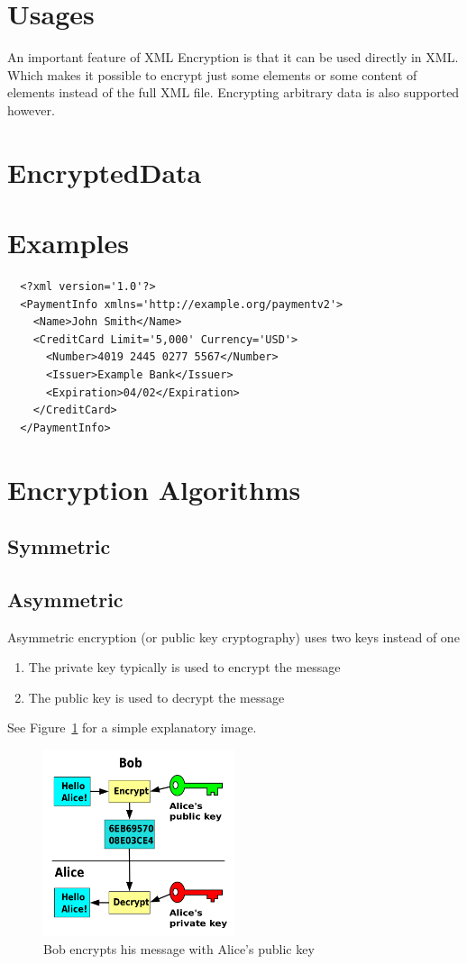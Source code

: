 \section{Usages}
An important feature of XML Encryption is that it can be used directly in XML\@.
Which makes it possible to encrypt just some elements or some content of
elements instead of the full XML file. Encrypting arbitrary data is also
supported however.
\section{EncryptedData}
\section{Examples}
\begin{verbatim}
  <?xml version='1.0'?>
  <PaymentInfo xmlns='http://example.org/paymentv2'>
    <Name>John Smith</Name>
    <CreditCard Limit='5,000' Currency='USD'>
      <Number>4019 2445 0277 5567</Number>
      <Issuer>Example Bank</Issuer>
      <Expiration>04/02</Expiration>
    </CreditCard>
  </PaymentInfo>
\end{verbatim}
\section{Encryption Algorithms}
\subsection{Symmetric}
\subsection{Asymmetric}
Asymmetric encryption (or public key cryptography) uses two keys instead of one

\begin{enumerate}
    \item The private key typically is used to encrypt the message
    \item The public key is used to decrypt the message
\end{enumerate}
See Figure~\ref{fig:public_key} for a simple explanatory image.

\begin{figure}
    \center{}
    \includegraphics[width=0.5\textwidth]{public_key}
    \caption{Bob encrypts his message with Alice's public
    key}\label{fig:public_key}
\end{figure}

